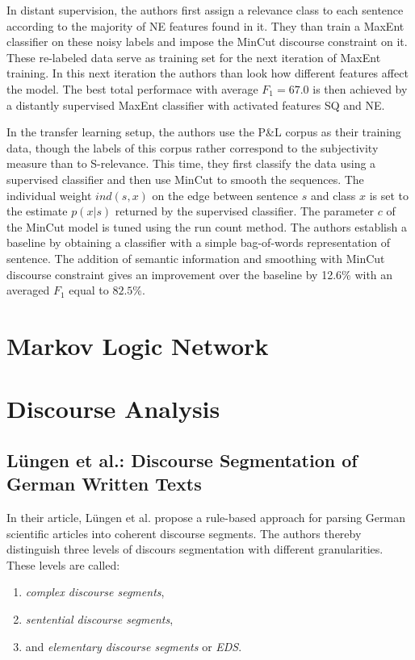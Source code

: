 \documentclass[a4paper,11pt]{article}
\begin{document}
In distant supervision, the authors first assign a relevance class to
each sentence according to the majority of NE features found in it.
They than train a MaxEnt classifier on these noisy labels and impose
the MinCut discourse constraint on it.  These re-labeled data serve as
training set for the next iteration of MaxEnt training.  In this next
iteration the authors than look how different features affect the
model.  The best total performace with average $F_1 = 67.0$ is then
achieved by a distantly supervised MaxEnt classifier with activated
features SQ and NE.

In the transfer learning setup, the authors use the P\&L corpus as
their training data, though the labels of this corpus rather
correspond to the subjectivity measure than to S-relevance.  This
time, they first classify the data using a supervised classifier and
then use MinCut to smooth the sequences.  The individual weight
$ind(s,x)$ on the edge between sentence $s$ and class $x$ is set to
the estimate $p(x|s)$ returned by the supervised classifier.  The
parameter $c$ of the MinCut model is tuned using the run count method.
The authors establish a baseline by obtaining a classifier with a
simple bag-of-words representation of sentence.  The addition of
semantic information and smoothing with MinCut discourse constraint
gives an improvement over the baseline by 12.6\% with an averaged
$F_1$ equal to $82.5\%$.

\section{Markov Logic Network}

\section{Discourse Analysis}

\subsection{L\"ungen et al.: Discourse Segmentation of German Written Texts\cite{Luengen-06}}

In their article, L\"ungen et al. \cite{Luengen-06} propose a rule-based
approach for parsing German scientific articles into coherent discourse
segments.  The authors thereby distinguish three levels of discours
segmentation with different granularities.  These levels are called:
\begin{enumerate}
  \item \textit{complex discourse segments},\label{enum-cds}
  \item \textit{sentential discourse segments},\label{enum-sds}
  \item and \textit{elementary discourse segments} or \textit{EDS}.\label{enum-eds}
\end{enumerate}
\end{document}
